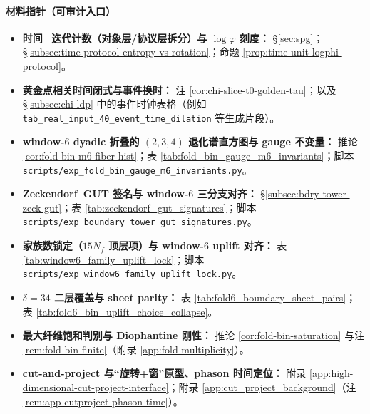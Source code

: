 \paragraph{材料指针（可审计入口）}
\begin{itemize}
  \item \textbf{时间=迭代计数（对象层/协议层拆分）与 \(\log\varphi\) 刻度：}
  \S\ref{sec:spg}；\S\ref{subsec:time-protocol-entropy-vs-rotation}；命题 \ref{prop:time-unit-logphi-protocol}。
  \item \textbf{黄金点相关时间闭式与事件换时：}
  注 \ref{cor:chi-slice-t0-golden-tau}；以及 \S\ref{subsec:chi-ldp} 中的事件时钟表格（例如 \texttt{tab\_real\_input\_40\_event\_time\_dilation} 等生成片段）。
  \item \textbf{window-\(6\) dyadic 折叠的 \((2,3,4)\) 退化谱直方图与 gauge 不变量：}
  推论 \ref{cor:fold-bin-m6-fiber-hist}；表 \ref{tab:fold_bin_gauge_m6_invariants}；脚本 \texttt{scripts/exp\_fold\_bin\_gauge\_m6\_invariants.py}。
  \item \textbf{Zeckendorf--GUT 签名与 window-\(6\) 三分支对齐：}
  \S\ref{subsec:bdry-tower-zeck-gut}；表 \ref{tab:zeckendorf_gut_signatures}；脚本 \texttt{scripts/exp\_boundary\_tower\_gut\_signatures.py}。
  \item \textbf{家族数锁定（\(15N_f\) 顶层项）与 window-\(6\) uplift 对齐：}
  表 \ref{tab:window6_family_uplift_lock}；脚本 \texttt{scripts/exp\_window6\_family\_uplift\_lock.py}。
  \item \textbf{\(\delta=34\) 二层覆盖与 sheet parity：}
  表 \ref{tab:fold6_boundary_sheet_pairs}；表 \ref{tab:fold6_bin_uplift_choice_collapse}。
  \item \textbf{最大纤维饱和判别与 Diophantine 刚性：}
  推论 \ref{cor:fold-bin-saturation} 与注 \ref{rem:fold-bin-finite}（附录 \ref{app:fold-multiplicity}）。
  \item \textbf{cut-and-project 与“旋转+\(\)窗”原型、phason 时间定位：}
  附录 \ref{app:high-dimensional-cut-project-interface}；附录 \ref{app:cut_project_background}（注 \ref{rem:app-cutproject-phason-time}）。
\end{itemize}

